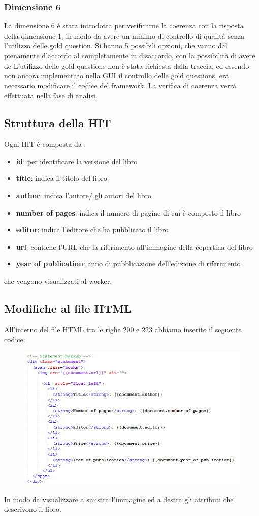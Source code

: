 \documentclass[a4paper,11pt]{report}
\begin{document}
\subsubsection{Dimensione 6}
La dimensione 6 è stata introdotta per verificarne la coerenza con la risposta della dimensione  1, in modo da avere un minimo di controllo di qualità senza l'utilizzo delle gold question. Si hanno 5 possibili opzioni, che vanno dal pienamente d'accordo al completamente in disaccordo, con la possibilità di avere de
L'utilizzo delle gold questions non è stata richiesta dalla traccia, ed essendo non ancora implementato nella GUI il controllo delle gold questions, era necessario modificare il codice del framework. La verifica di coerenza verrà effettuata nella fase di analisi.


\subsection{Struttura della HIT}
Ogni HIT è composta da : 
\begin{itemize}
	\item \textbf{id}: per identificare la versione del libro
	\item \textbf{title}: indica il titolo del libro
	\item \textbf{author}: indica l'autore/ gli autori del libro
	\item \textbf{number of pages}: indica il numero di pagine di cui è composto il libro
	\item \textbf{editor}: indica l'editore che ha pubblicato il libro
	\item \textbf{url}: contiene l'URL che fa riferimento all'immagine della copertina del libro
	\item \textbf{year of publication}: anno di pubblicazione dell'edizione di riferimento
\end{itemize}
che vengono visualizzati al worker.
 \pagebreak
\subsection{Modifiche al file HTML}
All'interno del file HTML tra le righe 200 e 223 abbiamo inserito il seguente codice: \\
\begin{figure}[h]
	\centering
	\includegraphics[width=0.9\linewidth]{statement}
	\label{fig:statement}
\end{figure}
In modo da visualizzare a sinistra l'immagine ed a destra gli attributi che descrivono il libro.
\end{document}
